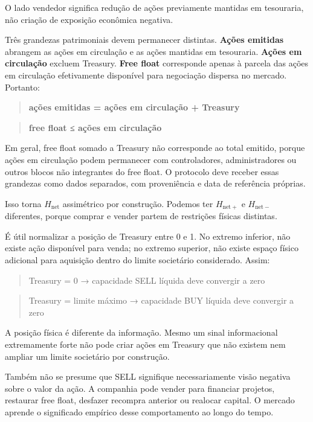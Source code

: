 \documentclass[
  a4paper,
]{article}
\begin{document}
O lado vendedor significa redução de ações previamente mantidas em
tesouraria, não criação de exposição econômica negativa.

Três grandezas patrimoniais devem permanecer distintas. \textbf{Ações
emitidas} abrangem as ações em circulação e as ações mantidas em
tesouraria. \textbf{Ações em circulação} excluem Treasury. \textbf{Free
float} corresponde apenas à parcela das ações em circulação efetivamente
disponível para negociação dispersa no mercado. Portanto:

\begin{quote}
\textbf{ações emitidas = ações em circulação + Treasury}
\end{quote}

\begin{quote}
\textbf{free float ≤ ações em circulação}
\end{quote}

Em geral, free float somado a Treasury não corresponde ao total emitido,
porque ações em circulação podem permanecer com controladores,
administradores ou outros blocos não integrantes do free float. O
protocolo deve receber essas grandezas como dados separados, com
proveniência e data de referência próprias.

Isso torna \(H_{\mathrm{net}}\) assimétrico por construção. Podemos ter
\(H_{\mathrm{net}+}\) e \(H_{\mathrm{net}-}\) diferentes, porque comprar
e vender partem de restrições físicas distintas.

É útil normalizar a posição de Treasury entre 0 e 1. No extremo
inferior, não existe ação disponível para venda; no extremo superior,
não existe espaço físico adicional para aquisição dentro do limite
societário considerado. Assim:

\begin{quote}
Treasury = 0 → capacidade SELL líquida deve convergir a zero
\end{quote}

\begin{quote}
Treasury = limite máximo → capacidade BUY líquida deve convergir a zero
\end{quote}

A posição física é diferente da informação. Mesmo um sinal informacional
extremamente forte não pode criar ações em Treasury que não existem nem
ampliar um limite societário por construção.

Também não se presume que SELL signifique necessariamente visão negativa
sobre o valor da ação. A companhia pode vender para financiar projetos,
restaurar free float, desfazer recompra anterior ou realocar capital. O
mercado aprende o significado empírico desse comportamento ao longo do
tempo.
\end{document}
